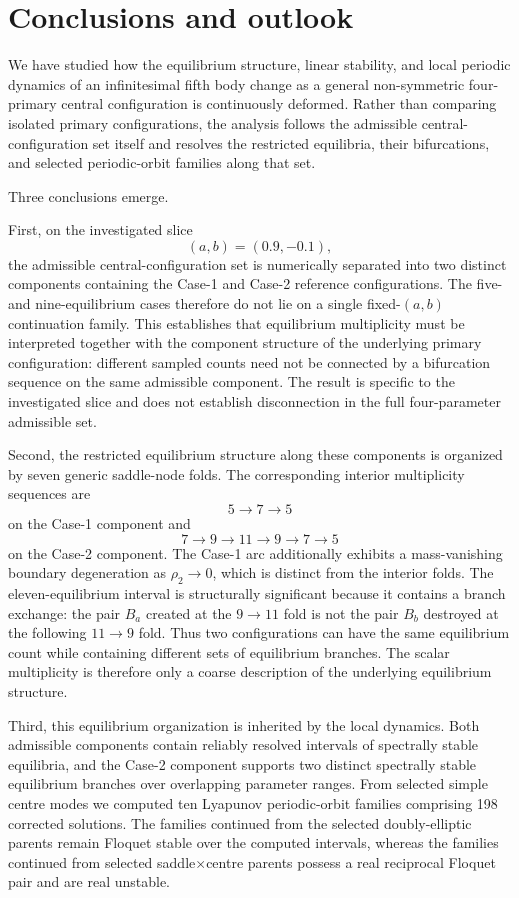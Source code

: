\section{Conclusions and outlook}
\label{sec:conclusions}

We have studied how the equilibrium structure, linear stability, and local
periodic dynamics of an infinitesimal fifth body change as a general
non-symmetric four-primary central configuration is continuously deformed.
Rather than comparing isolated primary configurations, the analysis follows
the admissible central-configuration set itself and resolves the restricted
equilibria, their bifurcations, and selected periodic-orbit families along
that set.

Three conclusions emerge.

First, on the investigated slice
\[
(a,b)=(0.9,-0.1),
\]
the admissible central-configuration set is numerically separated into two
distinct components containing the Case-1 and Case-2 reference
configurations. The five- and nine-equilibrium cases therefore do not lie
on a single fixed-$(a,b)$ continuation family. This establishes that
equilibrium multiplicity must be interpreted together with the component
structure of the underlying primary configuration: different sampled
counts need not be connected by a bifurcation sequence on the same
admissible component. The result is specific to the investigated slice and
does not establish disconnection in the full four-parameter admissible set.

Second, the restricted equilibrium structure along these components is
organized by seven generic saddle-node folds. The corresponding interior
multiplicity sequences are
\[
5\rightarrow7\rightarrow5
\]
on the Case-1 component and
\[
7\rightarrow9\rightarrow11\rightarrow9\rightarrow7\rightarrow5
\]
on the Case-2 component. The Case-1 arc additionally exhibits a
mass-vanishing boundary degeneration as $\rho_2\rightarrow0$, which is
distinct from the interior folds. The eleven-equilibrium interval is
structurally significant because it contains a branch exchange: the pair
$B_a$ created at the $9\rightarrow11$ fold is not the pair $B_b$
destroyed at the following $11\rightarrow9$ fold. Thus two configurations
can have the same equilibrium count while containing different sets of
equilibrium branches. The scalar multiplicity is therefore only a coarse
description of the underlying equilibrium structure.

Third, this equilibrium organization is inherited by the local dynamics.
Both admissible components contain reliably resolved intervals of
spectrally stable equilibria, and the Case-2 component supports two
distinct spectrally stable equilibrium branches over overlapping parameter
ranges. From selected simple centre modes we computed ten Lyapunov
periodic-orbit families comprising 198 corrected solutions. The families
continued from the selected doubly-elliptic parents remain Floquet stable
over the computed intervals, whereas the families continued from selected
saddle$\times$centre parents possess a real reciprocal Floquet pair and are
real unstable.

